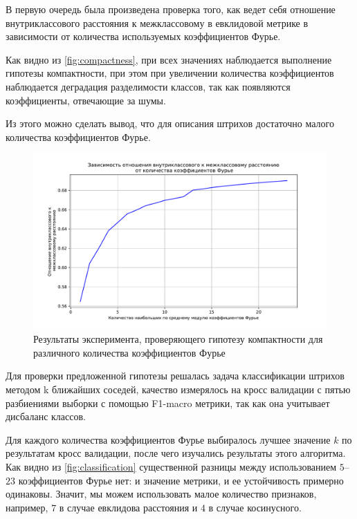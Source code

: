 \documentclass{article}
\begin{document}
В первую очередь была произведена проверка того, как ведет себя отношение внутриклассового расстояния к межклассовому в евклидовой метрике в зависимости от количества используемых коэффициентов Фурье. 
\par Как видно из \autoref{fig:compactness}, при всех значениях наблюдается выполнение гипотезы компактности, при этом при увеличении количества коэффициентов наблюдается деградация разделимости классов, так как появляются коэффициенты, отвечающие за шумы. 
\par Из этого можно сделать вывод, что для описания штрихов достаточно малого количества коэффициентов Фурье.
\begin{figure}
    \centering
    \includegraphics[width=0.49\linewidth]{img/compactness.pdf}
    \caption{Результаты эксперимента, проверяющего гипотезу компактности для различного количества коэффициентов Фурье}
    \label{fig:compactness}
\end{figure}
\par Для проверки предложенной гипотезы решалась задача классификации штрихов методом k ближайших соседей, качество измерялось на кросс валидации с пятью разбиениями выборки с помощью F1-macro метрики, так как она учитывает дисбаланс классов. 
\par Для каждого количества коэффициентов Фурье выбиралось лучшее значение $k$ по результатам кросс валидации, после чего изучались результаты этого алгоритма. 
Как видно из \autoref{fig:classification} существенной разницы между использованием $5$--$23$ коэффициентов Фурье нет: и значение метрики, и ее устойчивость примерно одинаковы. 
Значит, мы можем использовать малое количество признаков, например, $7$ в случае евклидова расстояния и $4$ в случае косинусного. 
\end{document}
